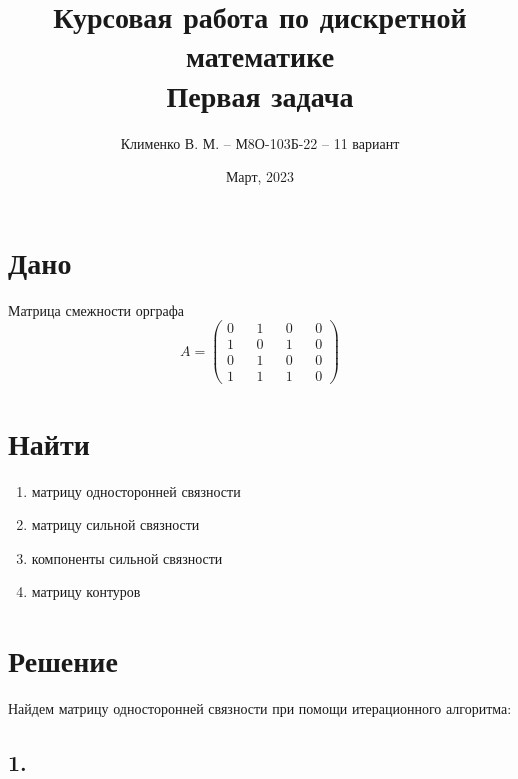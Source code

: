 \documentclass{article}
\title{Курсовая работа по дискретной математике\\Первая задача}
\author{Клименко В. М. -- М8О-103Б-22 -- 11 вариант}
\date{Март, 2023}
\begin{document}
\maketitle
               
\section*{Дано}
Матрица смежности орграфа
$$
A =
\begin{pmatrix}
  0 && 1 && 0 && 0 \\
  1 && 0 && 1 && 0 \\
  0 && 1 && 0 && 0 \\
  1 && 1 && 1 && 0
\end{pmatrix}
$$

\section*{Найти}
\begin{enumerate}
\item матрицу односторонней связности
\item матрицу сильной связности
\item компоненты сильной связности 
\item матрицу контуров
\end{enumerate}

\section*{Решение}
Найдем матрицу односторонней связности при помощи итерационного алгоритма:

\subsection*{1.}
\end{document}
